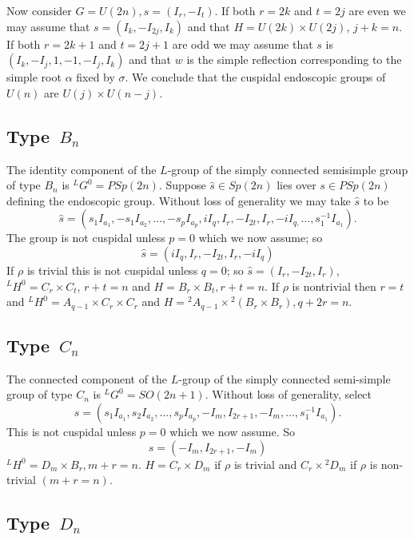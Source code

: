 \documentclass{memo-l}
\theoremstyle{definition}
\theoremstyle{remark}
\numberwithin{section}{chapter}
\numberwithin{equation}{chapter}
\begin{document}
   Now consider $G = U(2n), s = (I_{r},-I_{t})$.  If both $r = 2k$ and $t = 2j$ are
even we may assume that $s = (I_{k},-I_{2j},I_{k})$ and that $H = U(2k)\times U(2j)$,
 $j+k = n$.  If both $r = 2k+1$ and $t = 2j+1$ are odd we may assume that $s$ is
$(I_{k},-I_{j},1,-1,-I_{j},I_{k})$ and that $w$ is the simple reflection
corresponding to the simple root ${\alpha}$ fixed by ${\sigma}$.  We
conclude that the cuspidal endoscopic groups of $U(n)$ are $U(j)\times
U(n-j)$.


\subsection{Type\ $B_n$}


   The identity component of the $L$-group of the simply connected
semisimple group of type $B_{n}$ is ${}^{L}G^{0}  =  PSp(2n)$.  Suppose  $\hat s
 \in  Sp(2n)$ lies over $s  \in  PSp(2n)$ defining the endoscopic group.
Without loss of generality we may take $\hat s $ to be
$$
\hat s = (s_{1}I_{a_1} ,-s_{1}I_{a_{2}},\ldots,-s_{p}I_{a_p},
iI_{q},I_{r},-I_{2t},I_{r},-iI_{q,}\ldots ,s_{1}^{-1}I_{a_1} ).
$$
The group is not cuspidal unless $p = 0$ which we now assume; so $$\hat s  =
(iI_{q},I_{r},-I_{2t},I_{r},-iI_{q})$$  If ${\rho }$ is trivial this is not
cuspidal unless $q = 0$; so $\hat s  = (I_{r},-I_{2t},I_{r})$,\ \  ${}^{L}H^{0}  =
C_{r}\times C_{t}$, $r+t = n$ and $H = B_{r}\times B_{t}, r+t = n$.
If ${\rho }$ is nontrivial then $r = t$ and ${}^{L}H^{0}  =
A_{q-1}\times C_{r}\times C_{r}$ and $H  =  {}^{2}A_{q-1}
\times {}^{2}(B_{r}\times B_{r}), q+2r = n$.

\subsection{Type\ $C_n$}

The connected component of the $L$-group of
the simply connected semi-simple group of type $C_{n}$ is ${}^{L}G^{0}  =
SO(2n+1)$.  Without loss of generality, select
$$
s = (s_{1}I_{a_{1}}, s_{2}I_{a_2} ,\ldots
,s_{p}I_{a_p},-I_{m},I_{2r+1},-I_{m},\ldots ,s_{1}^{-1}I_{a_1}).
$$
This is not cuspidal unless $p = 0$ which we now assume.  So
$$s = (-I_{m},I_{2r+1},-I_{m})$$  ${}^{L}H^{0} = D_{m}\times B_{r}, m+r = n$.
$H = C_{r}\times D_{m}$ if ${\rho }$ is trivial and $C_{r}\times {}^{2}D_{m}$ if ${\rho }$
is non-trivial $(m+r = n)$.

\subsection{Type\ $D_n$}
\end{document}
